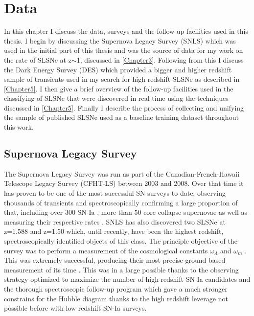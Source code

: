 
\chapter{Data} %
\label{Chapter2}

In this chapter I discuss the data, surveys and the follow-up facilities used in this thesis. I begin by discussing the Supernova Legacy Survey (SNLS) which was used in the initial part of this thesis and was the source of data for my work on the rate of SLSNe at z$\sim$1, discussed in \cref{Chapter3}. Following from this I discuss the Dark Energy Survey (DES) which provided a bigger and higher redshift sample of transients used in my search for high redshift SLSNe as described in \cref{Chapter5}. I then give a brief overview of the follow-up facilities used in the classifying of SLSNe that were discovered in real time using the techniques discussed in \cref{Chapter5}. Finally I describe the process of collecting and unifying the sample of published SLSNe used as a baseline training dataset throughout this work.

\section{Supernova Legacy Survey}
The Supernova Legacy Survey \citep{Boulade2003,Pritchet2004} was run as part of the Canadian-French-Hawaii Telescope Legacy Survey (CFHT-LS) between 2003 and 2008. Over that time it has proven to be one of the most successful SN surveys to date, observing thousands of transients and spectroscopically confirming a large proportion of that, including over 300 SN-Ia \citep{Perrett2010}, more than 50 core-collapse supernovae as well as measuring their respective rates \citep{Perrett2012,Bazin2009}. SNLS has also discovered two SLSNe at z=1.588 and z=1.50 \citep{Howell2013} which, until recently, have been the highest redshift, spectroscopically identified objects of this class. The principle objective of the survey was to perform a measurement of the cosmological constants $\omega_{\Lambda}$ and $\omega_{m}$ \citep{Astier2006}. This was extremely successful, producing their most precise ground based measurement of its time \citep{Sullivan2006}. This was in a large possible thanks to the observing strategy optimized to maximize the number of high redshift SN-Ia candidates and the thorough spectroscopic follow-up program  which gave a much stronger constrains for the Hubble diagram thanks to the high redshift leverage not possible before with low redshift SN-Ia surveys.

